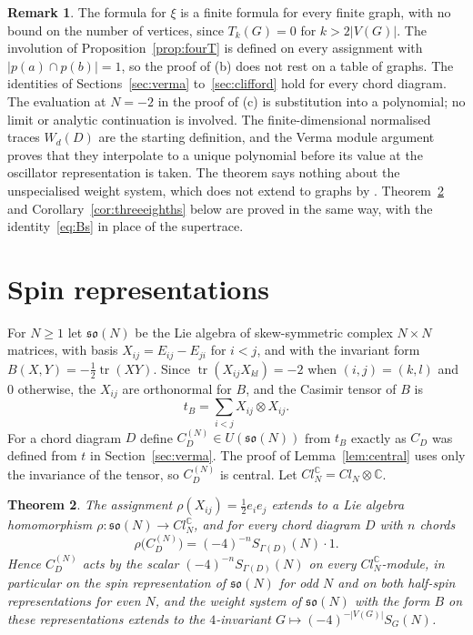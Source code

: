 \documentclass[11pt,a4paper,reqno]{amsart}
\newtheorem{theorem}{Theorem}[section]
\theoremstyle{definition}
\newtheorem{remark}[theorem]{Remark}
\newcommand{\tr}{\operatorname{tr}}
\begin{document}
\begin{remark}\label{rem:scope}
The formula for $\xi$ is a finite formula for every finite graph, with no bound on the number of vertices, since $T_k(G)=0$ for $k>2|V(G)|$. The involution of Proposition~\ref{prop:fourT} is defined on every assignment with $|p(a)\cap p(b)|=1$, so the proof of (b) does not rest on a table of graphs. The identities of Sections~\ref{sec:verma} to~\ref{sec:clifford} hold for every chord diagram. The evaluation at $N=-2$ in the proof of (c) is substitution into a polynomial; no limit or analytic continuation is involved. The finite-dimensional normalised traces $W_d(D)$ are the starting definition, and the Verma module argument proves that they interpolate to a unique polynomial before its value at the oscillator representation is taken. The theorem says nothing about the unspecialised weight system, which does not extend to graphs by \cite{FKPU}. Theorem~\ref{thm:spin} and Corollary~\ref{cor:threeeighths} below are proved in the same way, with the identity~\eqref{eq:Bs} in place of the supertrace.
\end{remark}

\section{Spin representations}\label{sec:spin}

For $N\ge1$ let $\mathfrak{so}(N)$ be the Lie algebra of skew-symmetric complex $N\times N$ matrices, with basis $X_{ij}=E_{ij}-E_{ji}$ for $i<j$, and with the invariant form $B(X,Y)=-\frac12\tr(XY)$. Since $\tr(X_{ij}X_{kl})=-2$ when $(i,j)=(k,l)$ and $0$ otherwise, the $X_{ij}$ are orthonormal for $B$, and the Casimir tensor of $B$ is
\[
t_B=\sum_{i<j}X_{ij}\otimes X_{ij}.
\]
For a chord diagram $D$ define $C^{(N)}_D\in U(\mathfrak{so}(N))$ from $t_B$ exactly as $C_D$ was defined from $t$ in Section~\ref{sec:verma}. The proof of Lemma~\ref{lem:central} uses only the invariance of the tensor, so $C^{(N)}_D$ is central. Let $Cl_N^{\mathbb C}=Cl_N\otimes\mathbb C$.

\begin{theorem}\label{thm:spin}
The assignment $\rho(X_{ij})=\frac12e_ie_j$ extends to a Lie algebra homomorphism $\rho\colon\mathfrak{so}(N)\to Cl_N^{\mathbb C}$, and for every chord diagram $D$ with $n$ chords
\[
\rho\bigl(C^{(N)}_D\bigr)=(-4)^{-n}S_{\Gamma(D)}(N)\cdot1 .
\]
Hence $C^{(N)}_D$ acts by the scalar $(-4)^{-n}S_{\Gamma(D)}(N)$ on every $Cl_N^{\mathbb C}$-module, in particular on the spin representation of $\mathfrak{so}(N)$ for odd $N$ and on both half-spin representations for even $N$, and the weight system of $\mathfrak{so}(N)$ with the form $B$ on these representations extends to the $4$-invariant $G\mapsto(-4)^{-|V(G)|}S_G(N)$.
\end{theorem}
\end{document}
